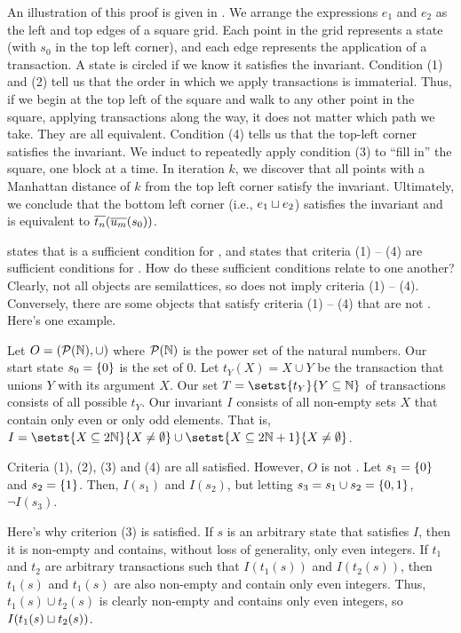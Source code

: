 {}

An illustration of this proof is given in . We
arrange the expressions $e_1$ and $e_2$ as the left and top edges of a square
grid. Each point in the grid represents a state (with $s_0$ in the top left
corner), and each edge represents the application of a transaction. A state is
circled if we know it satisfies the invariant.
%
Condition (1) and (2) tell us that the order in which we apply transactions is
immaterial. Thus, if we begin at the top left of the square and walk to any
other point in the square, applying transactions along the way, it does not
matter which path we take. They are all equivalent. Condition (4) tells us that
the top-left corner satisfies the invariant. We induct to repeatedly apply
condition (3) to ``fill in'' the square, one block at a time. In iteration $k$,
we discover that all points with a Manhattan distance of $k$ from the top left
corner satisfy the invariant. Ultimately, we conclude that the bottom left
corner (i.e., $e_1 \sqcup e_2$) satisfies the invariant and is equivalent to
$\overline{t_{n}}(\overline{u_{m}}(s_0))$.

 states that \invariantclosure{} is a
sufficient condition for \invariantconfluence{}, and 
states that criteria (1) -- (4) are sufficient conditions for
\invariantconfluence{}. How do these sufficient conditions relate to one
another?  Clearly, not all \invariantclosed{} objects are semilattices, so
\invariantclosure{} does not imply criteria (1) -- (4). Conversely, there are
some objects that satisfy criteria (1) -- (4) that are not
\invariantclosed{}. Here's one example.

\begin{example}
  Let $O = (\mathcal{P}(\mathbb{N}), \cup)$ where $\mathcal{P}(\mathbb{N})$ is the power
  set of the natural numbers. Our start state $s_0 = \{0\}$ is the set of
  $0$. Let $t_Y(X) = X \cup Y$ be the transaction that unions $Y$ with its
  argument $X$. Our set $T = \setst{t_Y}{Y \subseteq \nats}$ of transactions
  consists of all possible $t_Y$. Our invariant $I$ consists of all non-empty
  sets $X$ that contain only even or only odd elements. That is, $I = \setst{X
  \subseteq 2\nats}{X \neq \emptyset} \cup \setst{X \subseteq 2\nats + 1}{X
  \neq \emptyset}$.

  Criteria (1), (2), (3) and (4) are all satisfied. However, $O$ is not
  \Iclosed{}. Let $s_1 = \{0\}$ and $s_2 = \{1\}$. Then, $I(s_1)$ and
  $I(s_2)$, but letting $s_3 = s_1 \cup s_2 = \{0, 1\}$, $\lnot I(s_3)$.

  Here's why criterion (3) is satisfied. If $s$ is an arbitrary state that
  satisfies $I$, then it is non-empty and contains, without loss of generality,
  only even integers. If $t_1$ and $t_2$ are arbitrary transactions such that
  $I(t_1(s))$ and $I(t_2(s))$, then $t_1(s)$ and $t_1(s)$ are also non-empty
  and contain only even integers. Thus, $t_1(s) \cup t_2(s)$ is clearly
  non-empty and contains only even integers, so $I(t_1(s) \sqcup t_2(s))$.
\end{example}

